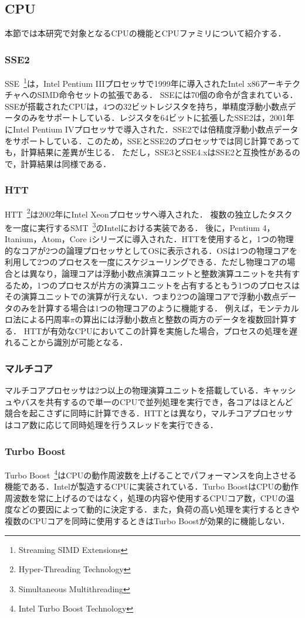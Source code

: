 \subsection{CPU}
本節では本研究で対象となるCPUの機能とCPUファミリについて紹介する．
\subsubsection{SSE2}
SSE~\footnote{Streaming SIMD Extensions}は，Intel Pentium IIIプロセッサで1999年に導入されたIntel x86アーキテクチャへのSIMD命令セットの拡張である． SSEには70個の命令が含まれている．SSEが搭載されたCPUは，4つの32ビットレジスタを持ち，単精度浮動小数点データのみをサポートしている．レジスタを64ビットに拡張したSSE2は，2001年にIntel Pentium IVプロセッサで導入された．SSE2では倍精度浮動小数点データをサポートしている．このため，SSEとSSE2のプロセッサでは同じ計算であっても，計算結果に差異が生じる．
ただし，SSE3とSSE4.xはSSE2と互換性があるので，計算結果は同様である．
\subsubsection{HTT}
HTT~\footnote{Hyper-Threading Technology}は2002年にIntel Xeonプロセッサへ導入された．
複数の独立したタスクを一度に実行するSMT~\footnote{Simultaneous Multithreading}のIntelにおける実装である．
後に，Pentium 4，Itanium，Atom，Core iシリーズに導入された．HTTを使用すると，1つの物理的なコアが2つの論理プロセッサとしてOSに表示される．OSは1つの物理コアを利用して2つのプロセスを一度にスケジューリングできる．ただし物理コアの場合とは異なり，論理コアは浮動小数点演算ユニットと整数演算ユニットを共有するため，1つのプロセスが片方の演算ユニットを占有するともう1つのプロセスはその演算ユニットでの演算が行えない．つまり2つの論理コアで浮動小数点データのみを計算する場合は1つの物理コアのように機能する．
例えば，モンテカルロ法による円周率$\pi$の算出には浮動小数点と整数の両方のデータを複数回計算する．
HTTが有効なCPUにおいてこの計算を実施した場合，プロセスの処理を遅れることから識別が可能となる．
\subsubsection{マルチコア}
マルチコアプロセッサは2つ以上の物理演算ユニットを搭載している．キャッシュやバスを共有するので単一のCPUで並列処理を実行でき，各コアはほとんど競合を起こさずに同時に計算できる．HTTとは異なり，マルチコアプロセッサはコア数に応じて同時処理を行うスレッドを実行できる．
\subsubsection{Turbo Boost}
Turbo Boost~\footnote{Intel Turbo Boost Technology}はCPUの動作周波数を上げることでパフォーマンスを向上させる機能である．Intelが製造するCPUに実装されている．Turbo BoostはCPUの動作周波数を常に上げるのではなく，処理の内容や使用するCPUコア数，CPUの温度などの要因によって動的に決定する．また，負荷の高い処理を実行するときや複数のCPUコアを同時に使用するときはTurbo Boostが効果的に機能しない．

